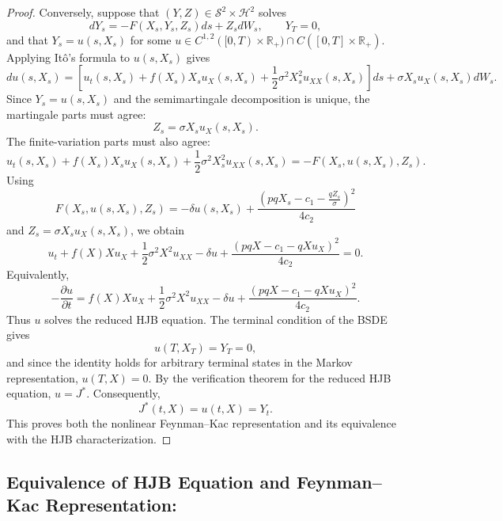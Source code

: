 \documentclass[11pt]{article}
\begin{document}
\begin{proof}
		Conversely, suppose that $(Y,Z)\in\mathcal{S}^2\times\mathcal{H}^2$ solves
		\[
		dY_s=-F(X_s,Y_s,Z_s)ds+Z_sdW_s,
		\qquad
		Y_T=0,
		\]
		and that $Y_s=u(s,X_s)$ for some $u\in C^{1,2}([0,T)\times\mathbb{R}_{+})\cap C([0,T]\times\mathbb{R}_{+})$. Applying It\^o's formula to $u(s,X_s)$ gives
		\[
		du(s,X_s)
		=
		\left[
		u_t(s,X_s)
		+
		f(X_s)X_su_X(s,X_s)
		+
		\frac12\sigma^2X_s^2u_{XX}(s,X_s)
		\right]ds
		+
		\sigma X_su_X(s,X_s)dW_s .
		\]
		Since $Y_s=u(s,X_s)$ and the semimartingale decomposition is unique, the martingale parts must agree:
		\[
		Z_s=\sigma X_su_X(s,X_s).
		\]
		The finite-variation parts must also agree:
		\[
		u_t(s,X_s)
		+
		f(X_s)X_su_X(s,X_s)
		+
		\frac12\sigma^2X_s^2u_{XX}(s,X_s)
		=
		-
		F(X_s,u(s,X_s),Z_s).
		\]
		Using
		\[
		F(X_s,u(s,X_s),Z_s)
		=
		-\delta u(s,X_s)
		+
		\frac{
			\left(
			pqX_s-c_1-\frac{qZ_s}{\sigma}
			\right)^2
		}{4c_2}
		\]
		and $Z_s=\sigma X_su_X(s,X_s)$, we obtain
		\[
		u_t
		+
		f(X)Xu_X
		+
		\frac12\sigma^2X^2u_{XX}
		-
		\delta u
		+
		\frac{(pqX-c_1-qXu_X)^2}{4c_2}
		=
		0.
		\]
		Equivalently,
		\[
		-\frac{\partial u}{\partial t}
		=
		f(X)Xu_X
		+
		\frac12\sigma^2X^2u_{XX}
		-
		\delta u
		+
		\frac{(pqX-c_1-qXu_X)^2}{4c_2}.
		\]
		Thus $u$ solves the reduced HJB equation. The terminal condition of the BSDE gives
		\[
		u(T,X_T)=Y_T=0,
		\]
		and since the identity holds for arbitrary terminal states in the Markov representation, $u(T,X)=0$. By the verification theorem for the reduced HJB equation, $u=J^*$. Consequently,
		\[
		J^*(t,X)=u(t,X)=Y_t.
		\]
		This proves both the nonlinear Feynman--Kac representation and its equivalence with the HJB characterization.
	\end{proof}
	
	
	\subsection{Equivalence of HJB Equation and Feynman--Kac Representation:}
	
\end{document}
